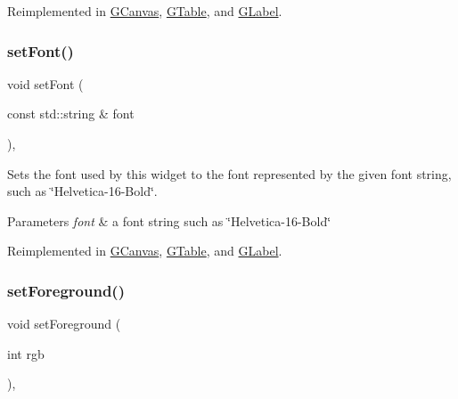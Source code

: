 Reimplemented in \mbox{\hyperlink{classsgl_1_1GCanvas_ad1d75b3840a41ba7d1e8a921696dc684}{G\+Canvas}}, \mbox{\hyperlink{classsgl_1_1GTable_ad1d75b3840a41ba7d1e8a921696dc684}{G\+Table}}, and \mbox{\hyperlink{classsgl_1_1GLabel_ad1d75b3840a41ba7d1e8a921696dc684}{G\+Label}}.

\mbox{\label{classsgl_1_1GInteractor_a8e096e8818d838aceae1d46d58fb3a7b}} 
\subsubsection{\texorpdfstring{set\+Font()}{setFont()}\hspace{0.1cm}{\footnotesize\ttfamily [2/2]}}
{\footnotesize\ttfamily void set\+Font (\begin{DoxyParamCaption}\item[{const std\+::string \&}]{font }\end{DoxyParamCaption})\hspace{0.3cm}{\ttfamily [virtual]}, {\ttfamily [inherited]}}



Sets the font used by this widget to the font represented by the given font string, such as \char`\"{}\+Helvetica-\/16-\/\+Bold\char`\"{}. 


\begin{DoxyParams}{Parameters}
{\em font} & a font string such as \char`\"{}\+Helvetica-\/16-\/\+Bold\char`\"{} \\
\hline
\end{DoxyParams}


Reimplemented in \mbox{\hyperlink{classsgl_1_1GCanvas_a51367c9fd2709973b1f7238734f93891}{G\+Canvas}}, \mbox{\hyperlink{classsgl_1_1GTable_a51367c9fd2709973b1f7238734f93891}{G\+Table}}, and \mbox{\hyperlink{classsgl_1_1GLabel_a51367c9fd2709973b1f7238734f93891}{G\+Label}}.

\mbox{\label{classsgl_1_1GInteractor_a9eb856b5ff83a19df3831a31f15f4563}} 
\subsubsection{\texorpdfstring{set\+Foreground()}{setForeground()}\hspace{0.1cm}{\footnotesize\ttfamily [1/2]}}
{\footnotesize\ttfamily void set\+Foreground (\begin{DoxyParamCaption}\item[{int}]{rgb }\end{DoxyParamCaption})\hspace{0.3cm}{\ttfamily [virtual]}, {\ttfamily [inherited]}}




